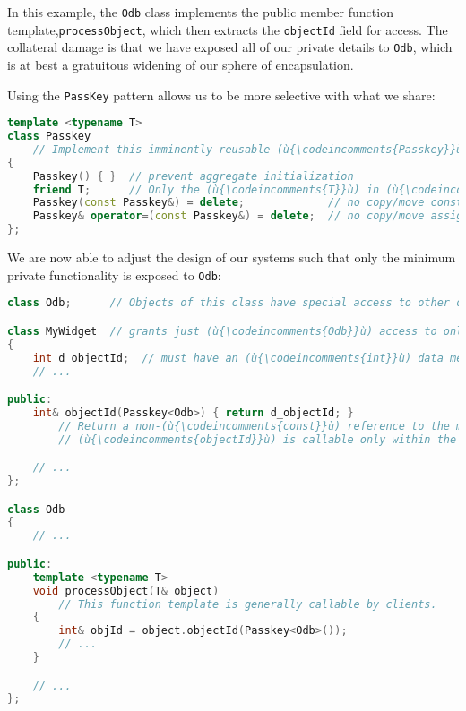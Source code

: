 \noindent In this example, the \texttt{Odb} class implements the public member
function template,\linebreak[4] \texttt{processObject}, which then extracts the
\texttt{objectId} field for access. The collateral damage is that we
have exposed all of our private details to \texttt{Odb}, which is at
best a gratuitous widening of our sphere of encapsulation.

Using the \texttt{PassKey} pattern allows us to be more selective with
what we share:

\begin{lstlisting}[language=C++]
template <typename T>
class Passkey
    // Implement this imminently reusable (ù{\codeincomments{Passkey}}ù) class template again here.
{
    Passkey() { }  // prevent aggregate initialization
    friend T;      // Only the (ù{\codeincomments{T}}ù) in (ù{\codeincomments{PassKey<T>}}ù) can create a (ù{\codeincomments{PassKey}}ù) object.
    Passkey(const Passkey&) = delete;             // no copy/move construction
    Passkey& operator=(const Passkey&) = delete;  // no copy/move assignment
};
\end{lstlisting}
    
\noindent We are now able to adjust the design of our systems such that only the
minimum private functionality is exposed to \texttt{Odb}:

\begin{lstlisting}[language=C++]
class Odb;      // Objects of this class have special access to other objects.

class MyWidget  // grants just (ù{\codeincomments{Odb}}ù) access to only its (ù{\codeincomments{objectId}}ù) member function
{
    int d_objectId;  // must have an (ù{\codeincomments{int}}ù) data member of any name we choose
    // ...

public:
    int& objectId(Passkey<Odb>) { return d_objectId; }
        // Return a non-(ù{\codeincomments{const}}ù) reference to the mandated (ù{\codeincomments{int}}ù) data member.
        // (ù{\codeincomments{objectId}}ù) is callable only within the scope of (ù{\codeincomments{Odb}}ù).

    // ...
};

class Odb
{
    // ...

public:
    template <typename T>
    void processObject(T& object)
        // This function template is generally callable by clients.
    {
        int& objId = object.objectId(Passkey<Odb>());
        // ...
    }

    // ...
};
\end{lstlisting}
    
